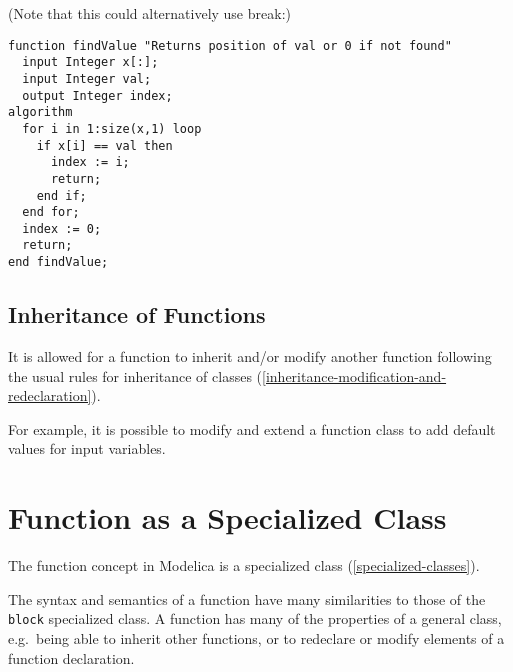 \begin{example}
(Note that this could alternatively use break:)
\begin{lstlisting}[language=modelica]
function findValue "Returns position of val or 0 if not found"
  input Integer x[:];
  input Integer val;
  output Integer index;
algorithm
  for i in 1:size(x,1) loop
    if x[i] == val then
      index := i;
      return;
    end if;
  end for;
  index := 0;
  return;
end findValue;
\end{lstlisting}
\end{example}

\subsection{Inheritance of Functions}\label{inheritance-of-functions}

It is allowed for a function to inherit and/or modify another function
following the usual rules for inheritance of classes (\cref{inheritance-modification-and-redeclaration}).

\begin{nonnormative}
For example, it is possible to modify and extend a function class to add default values for input variables.
\end{nonnormative}

\section{Function as a Specialized Class}\label{function-as-a-specialized-class}

The function concept in Modelica is a specialized class (\cref{specialized-classes}).

\begin{nonnormative}
The syntax and semantics of a function have many similarities to those of the \lstinline!block! specialized class. A function has many of the properties
of a general class, e.g.\ being able to inherit other functions, or to redeclare or modify elements of a function declaration.
\end{nonnormative}

